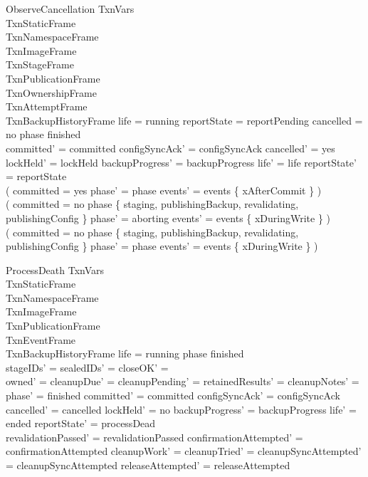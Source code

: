 \documentclass{article}
\begin{document}
\begin{schema}{ObserveCancellation}
	\Delta TxnVars \\
	TxnStaticFrame \\
	TxnNamespaceFrame \\
	TxnImageFrame \\
	TxnStageFrame \\
	TxnPublicationFrame \\
	TxnOwnershipFrame \\
	TxnAttemptFrame \\
	TxnBackupHistoryFrame
	\where
	life = running \land reportState = reportPending \land cancelled = no \land
	phase \neq finished \\
	committed' = committed \land configSyncAck' = configSyncAck \land
	cancelled' = yes \land lockHeld' = lockHeld \land
	backupProgress' = backupProgress \land life' = life \land
	reportState' = reportState \\
	( committed = yes \implies phase' = phase \land
	events' = events \cup \{ xAfterCommit \} ) \\
	( committed = no \land phase \in
	\{ staging, publishingBackup, revalidating, publishingConfig \} \implies
	phase' = aborting \land events' = events \cup \{ xDuringWrite \} ) \\
	( committed = no \land phase \notin
	\{ staging, publishingBackup, revalidating, publishingConfig \} \implies
	phase' = phase \land events' = events \cup \{ xDuringWrite \} )
\end{schema}

\begin{schema}{ProcessDeath}
	\Delta TxnVars \\
	TxnStaticFrame \\
	TxnNamespaceFrame \\
	TxnImageFrame \\
	TxnPublicationFrame \\
	TxnEventFrame \\
	TxnBackupHistoryFrame
	\where
	life = running \land phase \neq finished \\
	stageIDs' = \emptyset \land sealedIDs' = \emptyset \land closeOK' = \emptyset \\
	owned' = \emptyset \land cleanupDue' = \emptyset \land
	cleanupPending' = \emptyset \land retainedResults' = \emptyset \land
	cleanupNotes' = \emptyset \\
	phase' = finished \land committed' = committed \land
	configSyncAck' = configSyncAck \land cancelled' = cancelled \land
	lockHeld' = no \land backupProgress' = backupProgress \land
	life' = ended \land reportState' = processDead \\
	revalidationPassed' = revalidationPassed \land
	confirmationAttempted' = confirmationAttempted \land
	cleanupWork' = \emptyset \land cleanupTried' = \emptyset \land
	cleanupSyncAttempted' = cleanupSyncAttempted \land releaseAttempted' = releaseAttempted
\end{schema}
\end{document}
